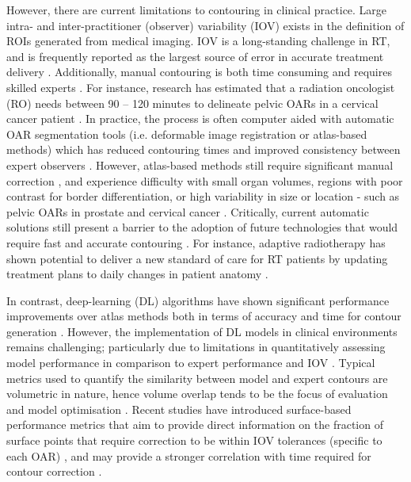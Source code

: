 However, there are current limitations to contouring in clinical practice. Large
intra- and inter-practitioner (observer) variability (IOV) exists in the
definition of ROIs generated from medical imaging. IOV is a long-standing
challenge in RT, and is frequently reported as the largest source of error in
accurate treatment delivery \cite{Vinod_2016, tg100}. Additionally, manual
contouring is both time consuming and requires skilled experts
\cite{Nikolov_2018}. For instance, research has estimated that a radiation
oncologist (RO) needs between 90 -- 120 minutes to delineate pelvic OARs in a
cervical cancer patient \cite{Liu_2020}. In practice, the process is often
computer aided with automatic OAR segmentation tools (i.e. deformable image
registration or atlas-based methods) which has reduced contouring times and
improved consistency between expert observers \cite{Vinod_2016}. However,
atlas-based methods still require significant manual correction 
\cite{Nikolov_2018}, and experience difficulty with small organ volumes, regions
with poor contrast for border differentiation, or high variability in size or location
- such as pelvic OARs in prostate and cervical cancer \cite{Schreier_2020,
Liu_2020}. Critically, current automatic solutions still present a barrier to
the adoption of future technologies that would require fast and accurate
contouring \cite{Nikolov_2018}. For instance, adaptive radiotherapy has shown
potential to deliver a new standard of care for RT patients by updating
treatment plans to daily changes in patient anatomy \cite{Nikolov_2018}.

In contrast, deep-learning (DL) algorithms have shown significant performance
improvements over atlas methods both in terms of accuracy and time for contour
generation \cite{Liu_2020}. However, the implementation of DL models in clinical
environments remains challenging; particularly due to limitations in
quantitatively assessing model performance in comparison to expert performance
and IOV \cite{Nikolov_2018}. Typical metrics used to quantify the similarity
between model and expert contours are volumetric in nature, hence volume overlap
tends to be the focus of evaluation and model optimisation \cite{Nikolov_2018}.
Recent studies have introduced surface-based performance metrics that aim to
provide direct information on the fraction of surface points that require
correction to be within IOV tolerances (specific to each OAR)
\cite{Nikolov_2018, Vaassen_2020}, and may provide a stronger correlation with
time required for contour correction \cite{Vaassen_2020}.

